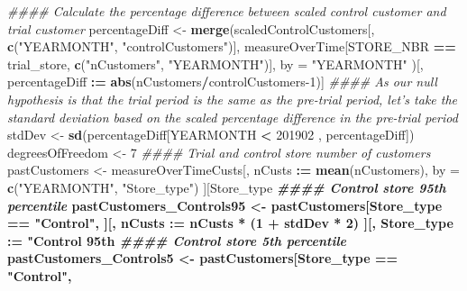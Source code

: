 \documentclass[]{article}
\newenvironment{Shaded}{\begin{snugshade}}{\end{snugshade}}
\newcommand{\CommentTok}[1]{\textcolor[rgb]{0.56,0.35,0.01}{\textit{#1}}}
\newcommand{\DataTypeTok}[1]{\textcolor[rgb]{0.13,0.29,0.53}{#1}}
\newcommand{\DecValTok}[1]{\textcolor[rgb]{0.00,0.00,0.81}{#1}}
\newcommand{\ErrorTok}[1]{\textcolor[rgb]{0.64,0.00,0.00}{\textbf{#1}}}
\newcommand{\KeywordTok}[1]{\textcolor[rgb]{0.13,0.29,0.53}{\textbf{#1}}}
\newcommand{\NormalTok}[1]{#1}
\newcommand{\OperatorTok}[1]{\textcolor[rgb]{0.81,0.36,0.00}{\textbf{#1}}}
\newcommand{\StringTok}[1]{\textcolor[rgb]{0.31,0.60,0.02}{#1}}
\begin{document}
\begin{Shaded}
\begin{Highlighting}[]
{{\CommentTok{#### Calculate the percentage difference between scaled control customer and trial customer}
\NormalTok{percentageDiff <-}\StringTok{ }\KeywordTok{merge}\NormalTok{(scaledControlCustomers[, }\KeywordTok{c}\NormalTok{(}\StringTok{"YEARMONTH"}\NormalTok{, }\StringTok{"controlCustomers"}\NormalTok{)],}
\NormalTok{                        measureOverTime[STORE_NBR }\OperatorTok{==}\StringTok{ }\NormalTok{trial_store, }\KeywordTok{c}\NormalTok{(}\StringTok{"nCustomers"}\NormalTok{, }\StringTok{"YEARMONTH"}\NormalTok{)],}
                        \DataTypeTok{by =} \StringTok{"YEARMONTH"}
\NormalTok{                        )[, percentageDiff }\OperatorTok{:}\ErrorTok{=}\StringTok{ }\KeywordTok{abs}\NormalTok{(nCustomers}\OperatorTok{/}\NormalTok{controlCustomers}\DecValTok{-1}\NormalTok{)]}
\CommentTok{#### As our null hypothesis is that the trial period is the same as the pre-trial period, let's take the standard deviation based on the scaled percentage difference in the pre-trial period}
\NormalTok{stdDev <-}\StringTok{ }\KeywordTok{sd}\NormalTok{(percentageDiff[YEARMONTH }\OperatorTok{<}\StringTok{ }\DecValTok{201902}\NormalTok{ , percentageDiff])}
\NormalTok{degreesOfFreedom <-}\StringTok{ }\DecValTok{7}
\CommentTok{#### Trial and control store number of customers}
\NormalTok{pastCustomers <-}\StringTok{ }\NormalTok{measureOverTimeCusts[, nCusts }\OperatorTok{:}\ErrorTok{=}\StringTok{ }\KeywordTok{mean}\NormalTok{(nCustomers), by =}\StringTok{ }
\StringTok{                                        }\KeywordTok{c}\NormalTok{(}\StringTok{"YEARMONTH"}\NormalTok{, }\StringTok{"Store_type"}\NormalTok{)}
\NormalTok{                                      ][Store_type }\OperatorTok{%
\CommentTok{#### Control store 95th percentile}
\NormalTok{pastCustomers_Controls95 <-}\StringTok{ }\NormalTok{pastCustomers[Store_type }\OperatorTok{==}\StringTok{ "Control"}\NormalTok{,}
\NormalTok{                                          ][, nCusts }\OperatorTok{:}\ErrorTok{=}\StringTok{ }\NormalTok{nCusts }\OperatorTok{*}\StringTok{ }\NormalTok{(}\DecValTok{1} \OperatorTok{+}\StringTok{ }\NormalTok{stdDev }\OperatorTok{*}\StringTok{ }\DecValTok{2}\NormalTok{)}
\NormalTok{                                          ][, Store_type }\OperatorTok{:}\ErrorTok{=}\StringTok{ "Control 95th %
\CommentTok{#### Control store 5th percentile}
\NormalTok{pastCustomers_Controls5 <-}\StringTok{ }\NormalTok{pastCustomers[Store_type }\OperatorTok{==}\StringTok{ "Control"}\NormalTok{,}
}}}}
\end{Highlighting}
\end{Shaded}
\end{document}
